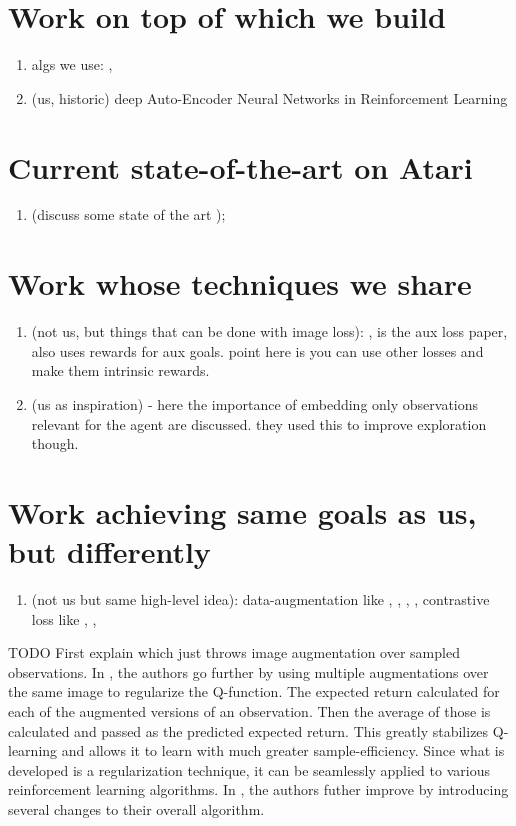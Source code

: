 \section{Work on top of which we build}
\begin{enumerate}
		\item algs we use: \cite{rainbow}, \cite{sac}
		\item (us, historic) deep Auto-Encoder Neural Networks in Reinforcement Learning 
				\cite{firstaeinrl}
\end{enumerate}


\section{Current state-of-the-art on Atari}
\begin{enumerate}
		\item (discuss some state of the art ); \cite{agent57}
\end{enumerate}

\section{Work whose techniques we share}
\begin{enumerate}
		\item (not us, but things that can be done with image loss): \cite{lossisitsownreward}, 
				\cite{rlwauxloss} is the aux loss paper, also uses rewards for aux goals.
				point here is you can use other losses and make them intrinsic rewards.
		\item (us as inspiration) \cite{icm} - here the importance of embedding only
				observations relevant for the agent are discussed.
				they used this to improve exploration though.
\end{enumerate}


\section{Work achieving same goals as us, but differently}
\begin{enumerate}
		\item (not us but same high-level idea): data-augmentation like \cite{drqv1},
				\cite{drqv2}, \cite{rad},
\cite{imageaugmentationisallyouneed},
				contrastive loss like \cite{curl}, 
				\cite{flow}, 
				\cite{invariantrepwithoutreconstruction}
\end{enumerate}
TODO
First explain \cite{rad} which just throws image augmentation over sampled observations.
In \cite{drqv1}, the authors go further by using multiple augmentations over the same image
to regularize the Q-function. The expected return calculated for each of the augmented 
versions of an observation. Then the average of those is calculated and passed
as the predicted expected return. This greatly stabilizes Q-learning
and allows it to learn with much greater sample-efficiency.
Since what is developed is a regularization technique, it can
be seamlessly applied to various reinforcement learning algorithms.
In \cite{drqv2}, the authors futher improve \cite{drqv1} by introducing several
changes to their overall algorithm.

